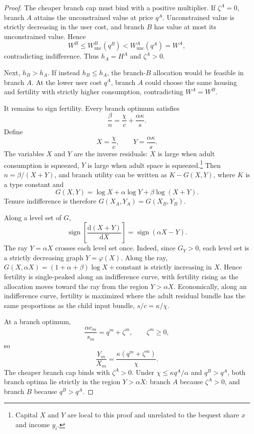 \documentclass[11pt]{article}
\newcommand{\dd}{\mathrm d}
\newcommand{\1}{\mathbf 1}
\begin{document}
\begin{proof}
The cheaper branch cap must bind with a positive multiplier. If $\zeta^A=0$, branch $A$ attains the unconstrained value at price $q^A$. Unconstrained value is strictly decreasing in the user cost, and branch $B$ has value at most its unconstrained value. Hence
\[
W^B\le W^B_{\mathrm{unc}}(q^B)<W^A_{\mathrm{unc}}(q^A)=W^A,
\]
contradicting indifference. Thus $h_A=H^A$ and $\zeta^A>0$.

Next, $h_B>h_A$. If instead $h_B\le h_A$, the branch-$B$ allocation would be feasible in branch $A$. At the lower user cost $q^A$, branch $A$ could choose the same housing and fertility with strictly higher consumption, contradicting $W^A=W^B$.

It remains to sign fertility. Every branch optimum satisfies
\[
\frac{\beta}{n}=\frac{\chi}{c}+\frac{\alpha\kappa}{s}.
\]
Define
\[
X=\frac{\chi}{c},
\qquad
Y=\frac{\alpha\kappa}{s}.
\]
The variables $X$ and $Y$ are the inverse residuals: $X$ is large when adult consumption is squeezed, $Y$ is large when adult space is squeezed.\footnote{Capital $X$ and $Y$ are local to this proof and unrelated to the bequest share $x$ and income $y_i$.}
Then $n=\beta/(X+Y)$, and branch utility can be written as $K-G(X,Y)$, where $K$ is a type constant and
\[
G(X,Y)=\log X+\alpha\log Y+\beta\log(X+Y).
\]
Tenure indifference is therefore $G(X_A,Y_A)=G(X_B,Y_B)$.

Along a level set of $G$,
\[
\operatorname{sign}\left[\frac{\dd(X+Y)}{\dd X}\right]
=
\operatorname{sign}(\alpha X-Y).
\]
The ray $Y=\alpha X$ crosses each level set once. Indeed, since $G_Y>0$, each level set is a strictly decreasing graph $Y=\varphi(X)$. Along the ray, $G(X,\alpha X)=(1+\alpha+\beta)\log X+\text{constant}$ is strictly increasing in $X$. Hence fertility is single-peaked along an indifference curve, with fertility rising as the allocation moves toward the ray from the region $Y>\alpha X$. Economically, along an indifference curve, fertility is maximized where the adult residual bundle has the same proportions as the child input bundle, $s/c=\kappa/\chi$.

At a branch optimum,
\[
\frac{\alpha c_m}{s_m}=q^m+\zeta^m,
\qquad
\zeta^m\ge0,
\]
so
\[
\frac{Y_m}{X_m}
=
\frac{\kappa(q^m+\zeta^m)}{\chi}.
\]
The cheaper branch cap binds with $\zeta^A>0$. Under $\chi\le\kappa q^A/\alpha$ and $q^B>q^A$, both branch optima lie strictly in the region $Y>\alpha X$: branch $A$ because $\zeta^A>0$, and branch $B$ because $q^B>q^A$.


\end{proof}
\end{document}
